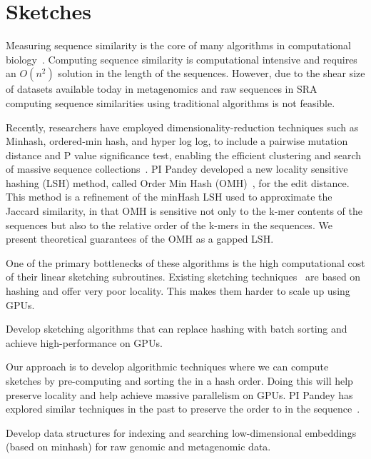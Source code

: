 \section{Sketches}

Measuring sequence similarity is the core of many algorithms in computational biology~\cite{Myers2000, Langmead2012,Li2010}. Computing sequence similarity is computational intensive and requires an $O(n^2)$ solution in the length of the sequences. However, due to the shear size of datasets available today in metagenomics and raw sequences in SRA computing sequence similarities using traditional algorithms is not feasible.

Recently, researchers have employed dimensionality-reduction techniques such as Minhash, ordered-min hash, and hyper log log, to include a pairwise mutation distance and P value significance test, enabling the efficient clustering and search of massive sequence collections~\cite{Mitzenmacher2014,ondov2016mash,Marais2019,Baker2019}. PI Pandey developed a new locality sensitive hashing (LSH) method, called Order Min Hash (OMH)~\cite{Marais2019}, for the edit distance. This method is a refinement of the minHash LSH used to approximate the Jaccard similarity, in that OMH is sensitive not only to the k-mer contents of the sequences but also to the relative order of the k-mers in the sequences. We present theoretical guarantees of the OMH as a gapped LSH\@.

One of the primary bottlenecks of these algorithms is the high computational cost of their linear sketching subroutines. Existing sketching techniques~\cite{ondov2016mash,Marais2019} are based on hashing and offer very poor locality. This makes them harder to scale up using GPUs.

\begin{rproblem}
Develop sketching algorithms that can replace hashing with batch sorting and achieve high-performance on GPUs.
\end{rproblem}

Our approach is to develop algorithmic techniques where we can compute sketches by pre-computing and sorting the \kmers in a hash order. Doing this will help preserve locality and help achieve massive parallelism on GPUs. PI Pandey has explored similar techniques in the past to preserve the order to \kmers in the sequence~\cite{Marais2019}.

\begin{rproblem}
Develop data structures for indexing and searching low-dimensional embeddings (based on minhash) for raw genomic and metagenomic data.
\end{rproblem}


